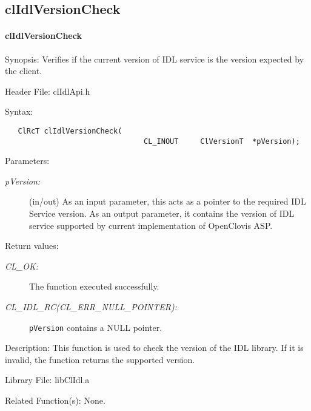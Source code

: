 \begin{flushleft}
\subsection{clIdlVersionCheck}
\hypertarget{pageidl203}{}\paragraph{cl\-Idl\-Version\-Check}\label{pageidl203}
\begin{Desc}
\item[Synopsis:]Verifies if the current version of IDL service is the version expected by the client.\end{Desc}
\begin{Desc}
\item[Header File:]clIdlApi.h\end{Desc}
\begin{Desc}
\item[Syntax:]

\footnotesize\begin{verbatim}   ClRcT clIdlVersionCheck(
                           		CL_INOUT     ClVersionT  *pVersion);
\end{verbatim}
\normalsize
\end{Desc}
\begin{Desc}
\item[Parameters:]
\begin{description}
\item[{\em p\-Version:}](in/out) As an input parameter, this acts as a pointer to the required IDL Service version. As an output parameter, it contains 
the version of IDL service supported by current implementation of OpenClovis ASP.
\end{description}
\end{Desc}
\begin{Desc}
\item[Return values:]
\begin{description}
\item[{\em CL\_\-OK:}]The function executed successfully. 
\item[{\em CL\_\-IDL\_\-RC(CL\_\-ERR\_\-NULL\_\-POINTER):}]{\tt{pVersion}} contains a NULL pointer.\end{description}
\end{Desc}
\begin{Desc}
\item[Description:]This function is used to check the version of the IDL library. If it is invalid, the function returns the supported version.\end{Desc}
\begin{Desc}
\item[Library File:]lib\-Cl\-Idl.a\end{Desc}
\begin{Desc}
\item[Related Function(s):]None. \end{Desc}


\end{flushleft}
